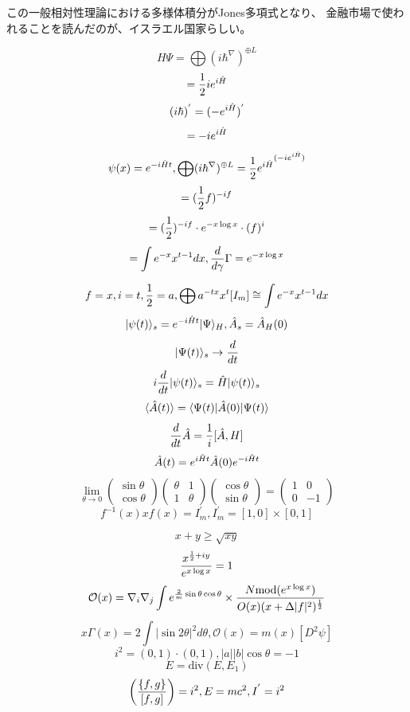 \documentclass{jsarticle}
\begin{document}
    この一般相対性理論における多様体積分がJones多項式となり、
    金融市場で使われることを読んだのが、イスラエル国家らしい。

    $$ H\Psi = \bigoplus {\left(i \hbar^{\nabla} \right)}^{\oplus L} $$
    $$ = {1 \over 2}i e^{i \Hat{H}} $$
    $$ (i \hbar)^{'} = (- e^{i \Hat{H}})^{'} $$
    $$ = - i e^{i \Hat{H}} $$
    $$ \psi(x) = e^{-i \Hat{H}t}, \bigoplus (i \hbar ^{\nabla})^{\oplus L} 
    = {{{1 \over 2} e^{i \Hat{H}}}^{(-i e^{i \Hat{H}})}} $$
    $$ = ({1 \over 2}f)^{-i f}$$
    $$ = ({1 \over 2})^{-i f} \cdot e^{-x \log x} \cdot (f)^{i} $$
    $$ = \int e^{- x} x^{t - 1}dx, {d \over d \gamma}\Gamma = e^{-x \log x}  $$
     
    $$ f = x, i = t, {1 \over 2} = a, \bigoplus a^{-t x}x^t [I_m]
     \cong \int e^{-x} x^{t - 1}dx $$
     $$ |\psi(t)\rangle_s = e^{-i\Hat{H} t}|\Psi\rangle_{H},
    \Hat{A}_s = \Hat{A}_H(0) $$
    $$ |\Psi(t)\rangle_s \to {d \over dt} $$
    $$ i {d \over dt}|\psi (t) \rangle_s = \Hat{H}|\psi(t)\rangle_s $$
    $$ \langle\Hat{A}(t)\rangle = \langle\Psi(t)|\Hat{A}(0)|\Psi(t)\rangle  $$
    $$ {d \over dt}\Hat{A} = {1 \over i}[\Hat{A},H] $$
    $$ \Hat{A}(t) = e^{i\Hat{H}t}\Hat{A}(0)e^{-i\Hat{H}t} $$
    $$ \lim_{\theta \to 0} \begin{pmatrix} \sin \theta \\
    \cos \theta \end{pmatrix} \begin{pmatrix} \theta & 1 \\
    1 & \theta \end{pmatrix} \begin{pmatrix} \cos \theta \\
    \sin \theta \end{pmatrix} = \begin{pmatrix} 1 & 0 \\
    0 & - 1 \end{pmatrix} $$
    $$ f^{-1}(x) x f(x) = I^{'}_m, I^{'}_m = [1,0] \times [0,1] $$

    $$ {x + y} \ge \sqrt{x y} $$
    $$ {x^{{1 \over 2} + iy} \over e^{x \log x}} = 1 $$
    $$ \mathcal{O}(x) = \nabla_i \nabla_j \int e^{{2 \over m}\sin \theta 
    \cos \theta } \times {{N \mathrm{mod}(e^{x \log x})} \over {O(x)(x +
    \Delta |f|^2)^{1 \over 2}}} $$
    $$ x \Gamma(x) = 2 \int|\sin 2 \theta|^2 d \theta, \mathcal{O}(x)
    = m(x)[D^2 \psi] $$
    $$ i^2 = (0,1) \cdot (0,1), |a||b|\cos \theta = - 1 $$
    $$ E = \mathrm{div}(E, E_1) $$
    $$ \left({\{f,g\}} \over [f,g] \right) = i^2, E = mc^2, I^{'} = i^2 $$
\end{document}
